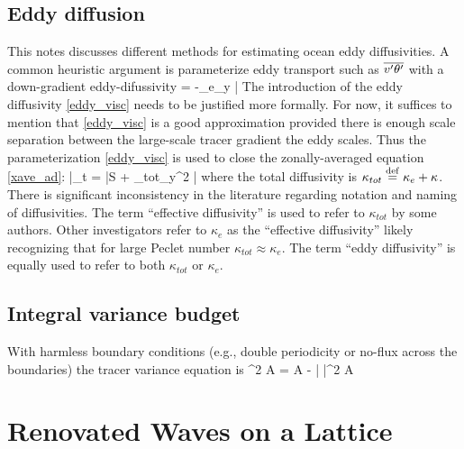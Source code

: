 \documentclass[11pt]{article}
\newcommand{\So}{\mathcal{S}}
\newcommand{\bvth}{\bar{\vth}}
\newcommand{\kappat}{\kappa_{tot}}
\newcommand{\kappae}{\kappa_{e}}
\begin{document}
\subsection{Eddy diffusion}
This notes discusses different methods for estimating ocean eddy diffusivities. A common heuristic argument is parameterize eddy transport such as $\overline{v'\theta'}$ with a down-gradient
 eddy-difussivity
\beq
\label{eddy_visc}
 = -\kappae \p_y \bvth\per
\eeq
The introduction of the eddy diffusivity \eqref{eddy_visc} needs to be justified more formally. For now, it suffices to mention that  \eqref{eddy_visc} is a good approximation provided there is enough scale separation between the large-scale tracer gradient the eddy scales. Thus the parameterization \eqref{eddy_visc}  is used to close the zonally-averaged equation \eqref{xave_ad}:
\beq
\label{xave_ad_2}
\bvth_t   = \bar{S} + \kappat \p_y^2 \bvth\com
\eeq
where the total diffusivity is $\kappat \defn \kappae + \kappa$. There is significant inconsistency in the literature regarding 
notation and naming of diffusivities.  The term ``effective diffusivity''  is used to refer to $\kappat$ by some authors. Other investigators refer to $\kappae$ as the ``effective diffusivity'' likely recognizing that for large Peclet number $\kappat \approx \kappae$. The term ``eddy diffusivity'' is equally used to refer to both $\kappat$ or $\kappae$.

\subsection{Integral variance budget}
With harmless boundary conditions (e.g., double periodicity or no-flux across the boundaries) the tracer variance
equation is
\beq
\label{varvth}
  \int \half \vth^2 \dd A = \int \vth \So \dd A - \kappa \int | \nabla \vth |^2 \dd A\per
\eeq
       



\section{Renovated Waves on a Lattice}
\end{document}
